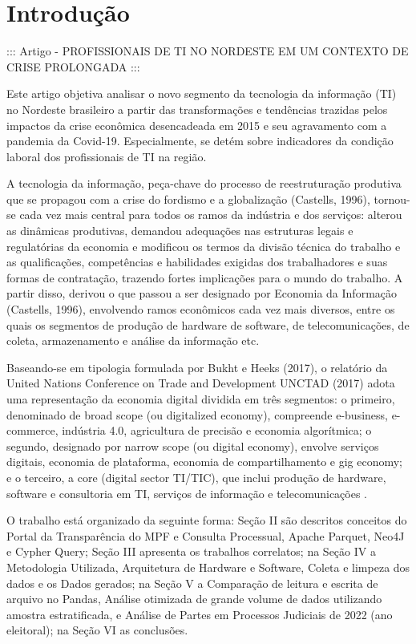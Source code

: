 \section{Introdução}

::: Artigo - PROFISSIONAIS DE TI NO NORDESTE EM UM CONTEXTO DE CRISE PROLONGADA :::

Este artigo objetiva analisar o novo segmento da tecnologia da informação (TI) no Nordeste brasileiro a partir das transformações e tendências trazidas pelos impactos da crise econômica desencadeada em 2015 e seu agravamento com a pandemia da Covid-19. Especialmente, se detém sobre indicadores da condição laboral dos profissionais de TI na região. 

A tecnologia da informação, peça-chave do processo de reestruturação produtiva que se propagou com a crise do fordismo e a globalização (Castells, 1996), tornou-se cada vez mais central para todos os ramos da indústria e dos serviços: alterou as dinâmicas produtivas, demandou adequações nas estruturas legais e regulatórias da economia e modificou os termos da divisão técnica do trabalho e as qualificações, competências e habilidades exigidas dos trabalhadores e suas formas de contratação, trazendo fortes implicações para o mundo do trabalho. A partir disso, derivou o que passou a ser designado por Economia da Informação (Castells, 1996), envolvendo ramos econômicos cada vez mais diversos, entre os quais os segmentos de produção de hardware de software, de telecomunicações, de coleta, armazenamento e análise da informação etc. 

Baseando-se em tipologia formulada por Bukht e Heeks (2017), o relatório da United Nations Conference on Trade and Development  UNCTAD (2017) adota uma representação da economia digital dividida em três segmentos: o primeiro, denominado de broad scope (ou digitalized economy), compreende e-business, e-commerce, indústria 4.0, agricultura de precisão e economia algorítmica; o segundo, designado por narrow scope (ou digital economy), envolve serviços digitais, economia de plataforma, economia de compartilhamento e gig economy; e o terceiro, a core (digital sector  TI/TIC), que inclui produção de hardware, software e consultoria em TI, serviços de informação e telecomunicações \cite{Sobre_o_MPF}.

O trabalho está organizado da seguinte forma: Seção II são descritos conceitos do Portal da Transparência do MPF e Consulta Processual, Apache Parquet, Neo4J e Cypher Query; Seção III apresenta os trabalhos correlatos; na Seção IV a Metodologia Utilizada, Arquitetura de Hardware e Software, Coleta e limpeza dos dados e os Dados gerados; na Seção V a Comparação de leitura e escrita de arquivo no Pandas, Análise otimizada de grande volume de dados utilizando amostra estratificada, e Análise de Partes em Processos Judiciais de 2022 (ano eleitoral); na Seção VI as conclusões.